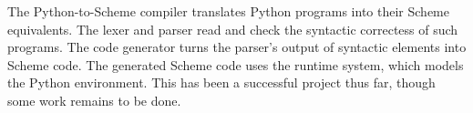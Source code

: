 
The Python-to-Scheme compiler translates Python programs into their Scheme equivalents.  The lexer and parser read and check the syntactic correctess of such programs.  The code generator turns the parser's output of syntactic elements into Scheme code.  The generated Scheme code uses the runtime system, which models the Python environment.  This has been a successful project thus far, though some work remains to be done.
